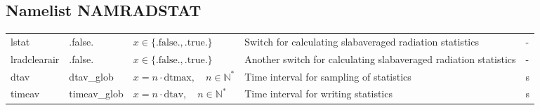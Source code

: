 \documentclass[twoside,11pt,fleqn,a4paper,english,openright]{report}
\begin{document}
\subsection{Namelist NAMRADSTAT}\label{par:radstat}
\begin{center}
  \tablelasttail{
        &&&&\\\hline
  }
\begin{supertabular}{|l|p{2cm}|p{4cm}|p{6cm}|l|}
  lstat	& .false.	& $x\in\{\text{.false.},\text{.true.}\}$	& Switch for calculating slabaveraged radiation statistics	& -\\
  lradclearair	& .false.	& $x\in\{\text{.false.},\text{.true.}\}$	& Another switch for calculating slabaveraged radiation statistics	& -\\
  dtav		& dtav\_glob	& $x = n \cdot \text{dtmax}, \quad n \in \mathbb{N}^*$	& Time interval for sampling of statistics	& s\\
  timeav	& timeav\_glob	& $x = n \cdot \text{dtav}, \quad n \in \mathbb{N}^*$	& Time interval for writing statistics		& s\\
\end{supertabular}
\end{center}

\end{document}
